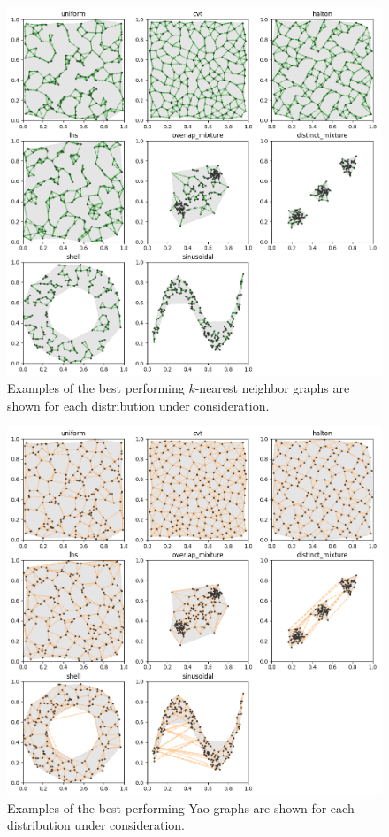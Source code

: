 \begin{figure}[htbp]
    \centering
    \includegraphics[width=\linewidth]{figs/chap7/k_quality.png}
    \caption{Examples of the best performing $k$-nearest neighbor graphs are shown for each distribution under consideration.}
    \label{fig:k_quality}
\end{figure}
\begin{figure}[htbp]
    \centering
    \includegraphics[width=\linewidth]{figs/chap7/yao_quality.png}
    \caption{Examples of the best performing Yao graphs are shown for each distribution under consideration.}
    \label{fig:yao_quality}
\end{figure}

